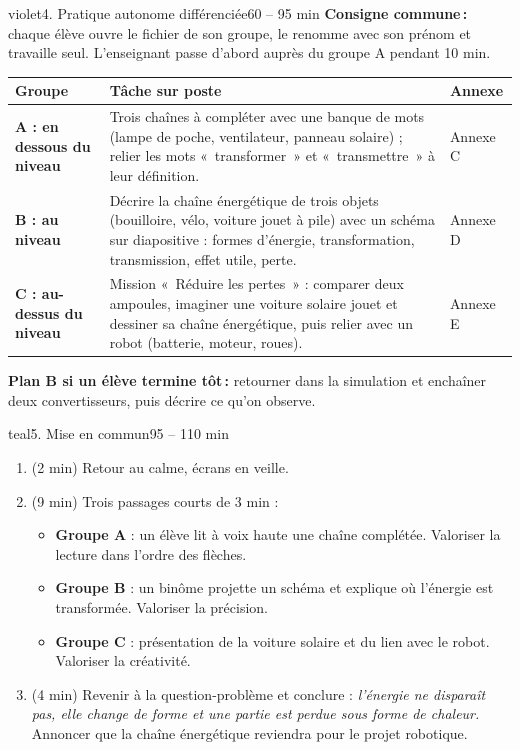 \documentclass[11pt,a4paper]{article}
\begin{document}
\begin{etape}{violet}{4. Pratique autonome différenciée}{60 -- 95 min}
\textbf{Consigne commune\,:} chaque élève ouvre le fichier de son groupe, le renomme avec son prénom et travaille seul. L'enseignant passe d'abord auprès du groupe A pendant 10 min.

\medskip
\begin{tabularx}{\linewidth}{>{\bfseries}p{3cm}Y p{3.2cm}}
\toprule
Groupe & Tâche sur poste & Annexe\\
\midrule
A : en dessous du niveau &
Trois chaînes à compléter avec une banque de mots (lampe de poche, ventilateur, panneau solaire) ; relier les mots «~transformer~» et «~transmettre~» à leur définition. & Annexe C\\
B : au niveau &
Décrire la chaîne énergétique de trois objets (bouilloire, vélo, voiture jouet à pile) avec un schéma sur diapositive : formes d'énergie, transformation, transmission, effet utile, perte. & Annexe D\\
C : au-dessus du niveau &
Mission «~Réduire les pertes~» : comparer deux ampoules, imaginer une voiture solaire jouet et dessiner sa chaîne énergétique, puis relier avec un robot (batterie, moteur, roues). & Annexe E\\
\bottomrule
\end{tabularx}

\medskip
\textbf{Plan B si un élève termine tôt\,:} retourner dans la simulation et enchaîner deux convertisseurs, puis décrire ce qu'on observe.
\end{etape}

\begin{etape}{teal}{5. Mise en commun}{95 -- 110 min}
\begin{enumerate}
 \item (2 min) Retour au calme, écrans en veille.
 \item (9 min) Trois passages courts de 3 min :
 \begin{itemize}
  \item \textbf{Groupe A} : un élève lit à voix haute une chaîne complétée. Valoriser la lecture dans l'ordre des flèches.
  \item \textbf{Groupe B} : un binôme projette un schéma et explique où l'énergie est transformée. Valoriser la précision.
  \item \textbf{Groupe C} : présentation de la voiture solaire et du lien avec le robot. Valoriser la créativité.
 \end{itemize}
 \item (4 min) Revenir à la question-problème et conclure : \textit{l'énergie ne disparaît pas, elle change de forme et une partie est perdue sous forme de chaleur.} Annoncer que la chaîne énergétique reviendra pour le projet robotique.
\end{enumerate}
\end{etape}
\end{document}
